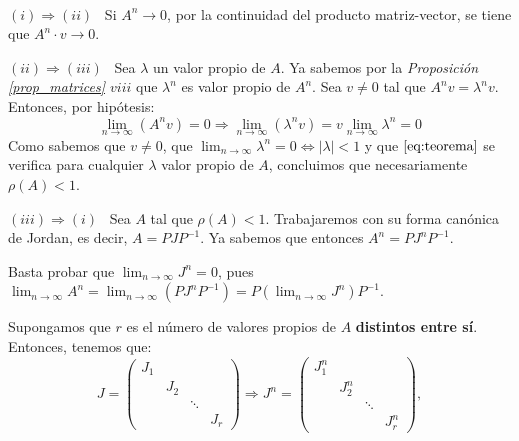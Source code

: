 \documentclass[11pt, a4paper]{article}
\makeatletter
\newif\IfInSansMode
\let\oldsf\sffamily
\renewcommand*{\sffamily}{\oldsf\mathversion{sans}\InSansModetrue}
\let\oldnorm\normalfont
\renewcommand*{\normalfont}{\oldnorm\InSansModefalse\mathversion{normal}}
\renewenvironment{proof}[1][\proofname] {\vspace{-15pt}\par\pushQED{\qed}\normalfont\topsep6\p@\@plus6\p@\relax\trivlist\item[\hskip\labelsep\it#1\@addpunct{.}]\ignorespaces}{\popQED\endtrivlist\@endpefalse}
\numberwithin{equation}{section}
\newcommand{\la}{\lambda}
\renewenvironment{proof}[1][\proofname] {\par\pushQED{\qed}\normalfont\topsep6\p@\@plus6\p@\relax\trivlist\item[\hskip\labelsep\itshape\sffamily#1\@addpunct{.}]\ignorespaces}{\popQED\endtrivlist\@endpefalse}
\theoremstyle{theorem-style}
\theoremstyle{definition-style}
\theoremstyle{remark-style}
\theoremstyle{example-style}
\makeatother
\begin{document}
\begin{proof}\hfill\\
    $\boxed{(i) \Rightarrow (ii)}$ \ Si $A^n \rightarrow 0$, por la continuidad del producto matriz-vector, se tiene que $A^n \cdot v \rightarrow 0$.
    
    $\boxed{(ii) \Rightarrow (iii)}$ \ Sea $\lambda$ un valor propio de $A$. Ya sabemos por la \textit{Proposición \ref{prop_matrices} $viii$} que $\lambda^n$ es valor propio de $A^n$. Sea $v\ne 0$ tal que $A^n v = \la^n v$. Entonces, por hipótesis: \begin{equation} \label{eq:teorema}
\lim_{n \to \infty}(A^n v) = 0 \Rightarrow \lim_{n \to \infty} (\lambda^n v) = v\lim_{n\to\infty} \la^n = 0
\end{equation}
   Como sabemos que $v\ne0$, que $\displaystyle \lim_{n\to\infty} \la^n = 0 \iff |\la| < 1$ y que $\eqref{eq:teorema}$ se verifica para cualquier $\la$ valor propio de $A$, concluimos que necesariamente $\rho(A) < 1$.

    $\boxed{(iii) \Rightarrow (i)}$ \ Sea $A$ tal que $\rho(A) < 1$. Trabajaremos con su forma canónica de Jordan, es decir, $A = PJP^{-1}$. Ya sabemos que entonces $A^n = PJ^nP^{-1}$.

    Basta probar que $\displaystyle \lim_{n \to \infty} J^n = 0$, pues $\displaystyle \lim_{n \to \infty} A^n = \lim_{n \to \infty} (PJ^nP^{-1}) = P(\lim_{n \to \infty} J^n)P^{-1}$.

    Supongamos que $r$ es el número de valores propios de $A$ \textbf{distintos entre sí}. Entonces, tenemos que: $$J = \begin{pmatrix}
        J_1 & & & \\
            & J_2 & & \\
            & & \ddots & \\
            & & & J_r
    \end{pmatrix} \Rightarrow J^n = \begin{pmatrix}
         J_1^n & & & \\
            & J_2^n & & \\
            & & \ddots & \\
            & & & J_r^n
    \end{pmatrix},$$


\end{proof}
\end{document}
